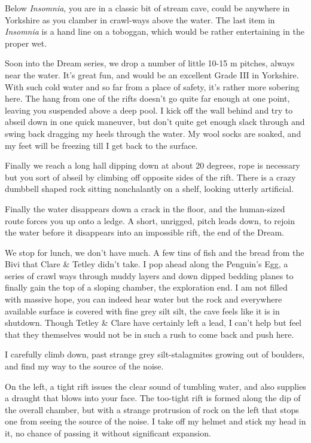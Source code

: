 Below \emph{Insomnia}, you are in a classic bit of stream cave, could be
anywhere in Yorkshire as you clamber in crawl-ways above the water. The
last item in \emph{Insomnia} is a hand line on a toboggan, which would
be rather entertaining in the proper wet.

Soon into the Dream series, we drop a number of little 10-15 m pitches,
always near the water. It's great fun, and would be an excellent Grade
III in Yorkshire. With such cold water and so far from a place of
safety, it's rather more sobering here. The hang from one of the rifts
doesn't go quite far enough at one point, leaving you suspended above a
deep pool. I kick off the wall behind and try to abseil down in one
quick maneuver, but don't quite get enough slack through and swing back
dragging my heels through the water. My wool socks are soaked, and my
feet will be freezing till I get back to the surface.

Finally we reach a long hall dipping down at about 20 degrees, rope is
necessary but you sort of abseil by climbing off opposite sides of the
rift. There is a crazy dumbbell shaped rock sitting nonchalantly on a
shelf, looking utterly artificial.

Finally the water disappears down a crack in the floor, and the
human-sized route forces you up onto a ledge. A short, unrigged, pitch
leads down, to rejoin the water before it disappears into an impossible
rift, the end of the Dream.

We stop for lunch, we don't have much. A few tins of fish and the bread
from the Bivi that Clare \& Tetley didn't take. I pop ahead along the
Penguin's Egg, a series of crawl ways through muddy layers and down
dipped bedding planes to finally gain the top of a sloping chamber, the
exploration end. I am not filled with massive hope, you can indeed hear
water but the rock and everywhere available surface is covered with fine
grey silt silt, the cave feels like it is in shutdown. Though Tetley \&
Clare have certainly left a lead, I can't help but feel that they
themselves would not be in such a rush to come back and push here.

I carefully climb down, past strange grey silt-stalagmites growing out
of boulders, and find my way to the source of the noise.

On the left, a tight rift issues the clear sound of tumbling water, and
also supplies a draught that blows into your face. The too-tight rift is
formed along the dip of the overall chamber, but with a strange
protrusion of rock on the left that stops one from seeing the source of
the noise. I take off my helmet and stick my head in it, no chance of
passing it without significant expansion.

